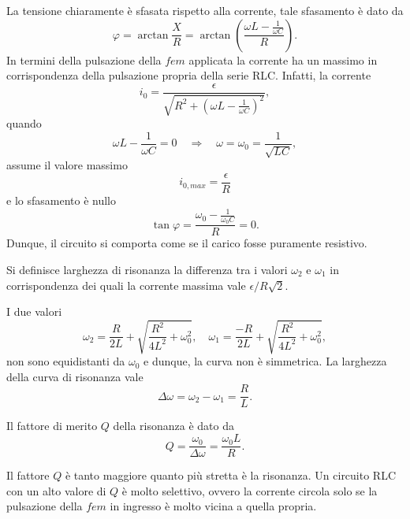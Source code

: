 La tensione chiaramente è sfasata rispetto alla corrente, tale sfasamento è dato da
\begin{equation}
    \varphi=\arctan{\frac{X}{R}}=\arctan{\left(\frac{\omega L-\frac{1}{\omega C}}{R}\right)}.
\end{equation}
In termini della pulsazione della $fem$ applicata la corrente ha un massimo in corrispondenza della pulsazione propria della serie RLC. Infatti, la corrente
\begin{equation}
    i_0=\frac{\epsilon}{\sqrt{R^2+\left(\omega L-\frac{1}{\omega C}\right)^2}},
\end{equation}
quando
\begin{equation}
    \omega L-\frac{1}{\omega C}=0\quad\Rightarrow\quad\omega=\omega_0=\frac{1}{\sqrt{LC}},
\end{equation}
assume il valore massimo
\begin{equation}
    i_{0,max}=\frac{\epsilon}{R}
\end{equation}
e lo sfasamento è nullo 
\begin{equation}
    \tan{\varphi}=\frac{\omega_0-\frac{1}{\omega_0C}}{R}=0.
\end{equation}
Dunque, il circuito si comporta come se il carico fosse puramente resistivo.
\begin{defn}
    Si definisce larghezza di risonanza la differenza tra i valori $\omega_2$ e $\omega_1$ in corrispondenza dei quali la corrente massima vale $\epsilon/R\sqrt{2}$. 
\end{defn}
I due valori 
    \begin{equation}
        \omega_2=\frac{R}{2L}+\sqrt{\frac{R^2}{4L^2}+\omega_0^2},\quad\omega_1=\frac{-R}{2L}+\sqrt{\frac{R^2}{4L^2}+\omega_0^2},
    \end{equation}
non sono equidistanti da $\omega_0$ e dunque, la curva non è simmetrica. La larghezza della curva di risonanza vale
\begin{equation}
    \Delta\omega=\omega_2-\omega_1=\frac{R}{L}.
\end{equation}
\begin{defn}
    Il fattore di merito $Q$ della risonanza è dato da
    \begin{equation}
        Q=\frac{\omega_0}{\Delta\omega}=\frac{\omega_0L}{R}.
    \end{equation}
\end{defn}
Il fattore $Q$ è tanto maggiore quanto più stretta è la risonanza. Un circuito RLC con un alto valore di $Q$ è molto selettivo, ovvero la corrente circola solo se la pulsazione della $fem$ in ingresso è molto vicina a quella propria.

